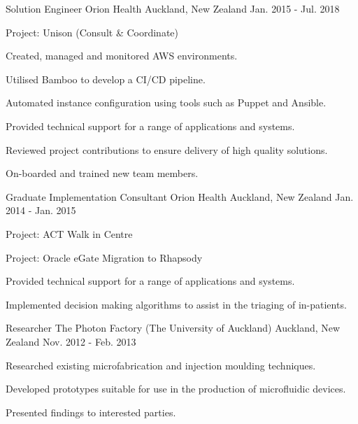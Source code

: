 \begin{cventries}
\cventry
{Solution Engineer} %
{Orion Health} %
{Auckland, New Zealand} %
{Jan. 2015 - Jul. 2018} %
{ %
\begin{cvitems}
\item {Project: Unison (Consult \& Coordinate)}
\item {Created, managed and monitored AWS environments.}
\item {Utilised Bamboo to develop a CI/CD pipeline.}
\item {Automated instance configuration using tools such as Puppet and }Ansible.
\item {Provided technical support for a range of applications and }systems.
\item {Reviewed project contributions to ensure delivery of high quality }solutions.
\item {On-boarded and trained new team members.}
\end{cvitems}
}


\cventry
{Graduate Implementation Consultant} %
{Orion Health} %
{Auckland, New Zealand} %
{Jan. 2014 - Jan. 2015} %
{ %
\begin{cvitems}
\item {Project: ACT Walk in Centre}
\item {Project: Oracle eGate Migration to Rhapsody}
\item {Provided technical support for a range of applications and systems.}
\item {Implemented decision making algorithms to assist in the triaging of in-patients.}
\end{cvitems}
}


\cventry
{Researcher} %
{The Photon Factory (The University of Auckland)} %
{Auckland, New Zealand} %
{Nov. 2012 - Feb. 2013} %
{ %
\begin{cvitems}
\item {Researched existing microfabrication and injection moulding techniques.}
\item {Developed prototypes suitable for use in the production of microfluidic devices.}
\item {Presented findings to interested parties.}
\end{cvitems}
}


\end{cventries}
